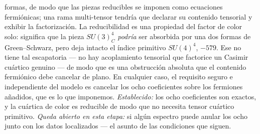 \documentclass[11pt,a4paper]{article}
\begin{document}
formas, de modo que las piezas reducibles se imponen como ecuaciones fermi\'onicas; una
rama multi-tensor tendr\'ia que declarar su contenido tensorial y exhibir la
factorizaci\'on. La reducibilidad es una propiedad del factor de color solo: significa que
la pieza $SU(3)_C^4$ \emph{podr\'ia} ser absorbida por una dos formas de Green--Schwarz,
pero deja intacto el \'indice primitivo $SU(4)^4$, $-579$. Ese no tiene tal escapatoria ---
no hay acoplamiento tensorial que factorice un Casimir cu\'artico genuino --- de modo que
es una obstrucci\'on absoluta que el contenido fermi\'onico debe cancelar de plano. En
cualquier caso, el requisito seguro e independiente del modelo es cancelar los ocho
coeficientes sobre los fermiones a\~nadidos, que es lo que imponemos. \emph{Establecido:}
los ocho coeficientes son exactos, y la cu\'artica de color es reducible de modo que no
necesita tensor cu\'artico primitivo. \emph{Queda abierto en esta etapa:} si alg\'un
espectro puede anular los ocho junto con los datos localizados --- el asunto de las
condiciones que siguen.

\end{document}
